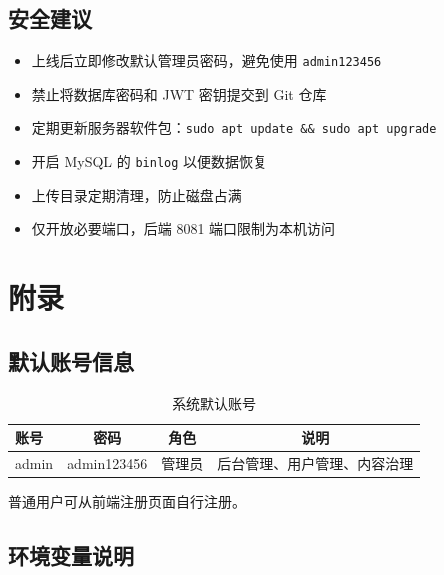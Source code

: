 \documentclass[bwprint]{report}
\begin{document}
\subsection{安全建议}

\begin{itemize}
    \item 上线后立即修改默认管理员密码，避免使用 \texttt{admin123456}
    \item 禁止将数据库密码和 JWT 密钥提交到 Git 仓库
    \item 定期更新服务器软件包：\texttt{sudo apt update \&\& sudo apt upgrade}
    \item 开启 MySQL 的 \texttt{binlog} 以便数据恢复
    \item 上传目录定期清理，防止磁盘占满
    \item 仅开放必要端口，后端 8081 端口限制为本机访问
\end{itemize}

\section{附录}

\subsection{默认账号信息}

\begin{table}[H]
    \caption{系统默认账号}
    \label{tab:default-accounts}
    \centering
    \begin{tabular}{lccc}
        \toprule[1.5pt]
        账号 & 密码 & 角色 & 说明 \\
        \midrule[1pt]
        admin & admin123456 & 管理员 & 后台管理、用户管理、内容治理 \\
        \bottomrule[1.5pt]
    \end{tabular}
\end{table}

普通用户可从前端注册页面自行注册。

\subsection{环境变量说明}
\end{document}
